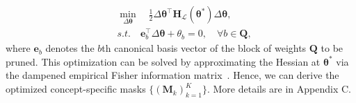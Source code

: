\documentclass[letterpaper]{article} %
\DeclareMathOperator*{\argmin}{arg\,min}
\begin{document}
\begin{equation}\label{eq:optimization}
    \begin{aligned}
        &\min_{\Delta \bm\theta} \quad \frac{1}{2} \Delta \bm{\theta}^\top \bm{H}_{\mathcal{L}} (\bm{\theta^\ast}) \Delta \bm\theta,
        \\& s.t. \quad \bm{e}_b^{\top} \Delta \bm\theta + \theta_b = 0, \quad \forall b \in \bm{Q},
    \end{aligned}
\end{equation}
where $\bm{e}_b$ denotes the $b$th canonical basis vector of the block of weights $\bm{Q}$ to be pruned.
This optimization can be solved by approximating the
Hessian at $\bm\theta^\ast$ via the dampened empirical Fisher
information matrix~\citep{hassibi1992second,kurtic2022optimal}. Hence, we can derive the optimized concept-specific masks $\{(\bm{M}_k)_{k=1}^K\}$. More details are in Appendix C.






\end{document}
